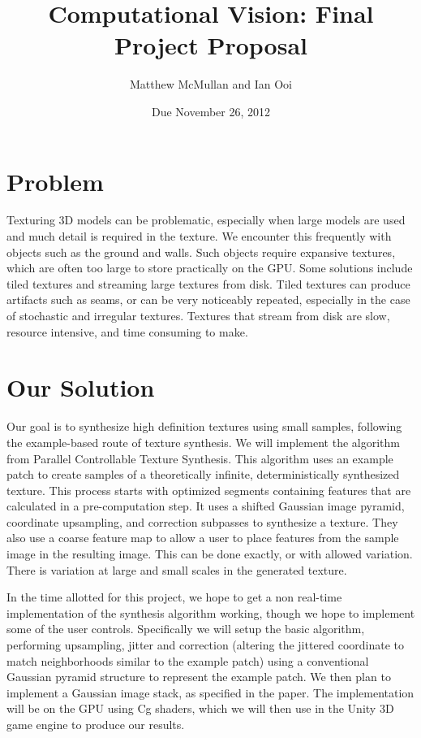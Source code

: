 \documentclass[12pt]{article}
\title{Computational Vision: Final Project Proposal}
\date{Due November 26, 2012}
\author{Matthew McMullan and Ian Ooi}
\begin{document}
	\maketitle
	\section{Problem}
		Texturing 3D models can be problematic, especially when large models are used and much detail is required in the texture.  We encounter this frequently with objects such as the ground and walls.  Such objects require expansive textures, which are often too large to store practically on the GPU.  Some solutions include tiled textures and streaming large textures from disk.  Tiled textures can produce artifacts such as seams, or can be very noticeably repeated, especially in the case of stochastic and irregular textures.  Textures that stream from disk are slow, resource intensive, and time consuming to make.

	\section{Our Solution}
	Our goal is to synthesize high definition textures using small samples, following the example-based route of texture synthesis.  We will implement the algorithm from Parallel Controllable Texture Synthesis.  This algorithm uses an example patch to create samples of a theoretically infinite, deterministically synthesized texture. This process starts with optimized segments containing features that are calculated in a pre-computation step. It uses a shifted Gaussian image pyramid, coordinate upsampling, and correction subpasses to synthesize a texture.  They also use a coarse feature map to allow a user to place features from the sample image in the resulting image.  This can be done exactly, or with allowed variation.  There is variation at large and small scales in the generated texture. 
	
	In the time allotted for this project, we hope to get a non real-time implementation of the synthesis algorithm working, though we hope to implement some of the user controls.  Specifically we will setup the basic algorithm, performing upsampling, jitter and correction (altering the jittered coordinate to match neighborhoods similar to the example patch) using a conventional Gaussian pyramid structure to represent the example patch.  We then plan to implement a Gaussian image stack, as specified in the paper.  The implementation will be on the GPU using Cg shaders, which we will then use in the Unity 3D game engine to produce our results.
	
\end{document}
